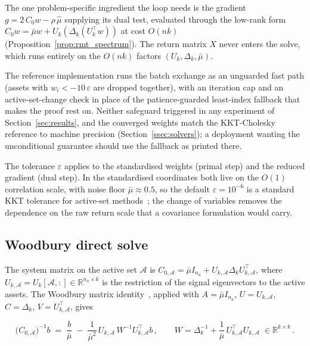 The one problem-specific ingredient the loop needs is the gradient
$g = 2\,C_0 w - \rho\,\hat\mu$ supplying its dual test, evaluated through the
low-rank form $C_0w = \bar\mu w + U_k(\Delta_k(U_k^\top w))$ at cost $O(nk)$
(Proposition~\ref{prop:rmt_spectrum}). The return matrix $X$ never enters the
solve, which runs entirely on the $O(nk)$ factors $(U_k, \Delta_k, \bar\mu)$.

\begin{remark}\label{rem:safeguards}
The reference implementation runs the batch exchange as an unguarded fast path
(assets with $w_i < -10\,\varepsilon$ are dropped together), with an iteration cap
and an active-set-change check in place of the patience-guarded least-index
fallback that~\cite[Algorithm~1]{schmelzer2026nncg} makes the proof rest on.
Neither safeguard triggered in any experiment of Section~\ref{sec:results}, and
the converged weights match the KKT-Cholesky reference to machine precision
(Section~\ref{ssec:solvers}); a deployment wanting the unconditional guarantee
should use the fallback as printed there.
\end{remark}

\begin{remark}\label{rem:tolerance}
The tolerance $\varepsilon$ applies to the standardised weights (primal step) and
the reduced gradient (dual step). In the standardised coordinates both live on the
$O(1)$ correlation scale, with noise floor $\bar\mu \approx 0.5$, so the default
$\varepsilon = 10^{-6}$ is a standard KKT tolerance for active-set
methods~\cite{nocedal2006}; the change of variables removes the dependence on the
raw return scale that a covariance formulation would carry.
\end{remark}

\subsection{Woodbury direct solve}\label{sec:woodbury}

The system matrix on the active set $\mathcal{A}$ is
$C_{0,\mathcal{A}} = \bar\mu I_{n_a} + U_{k,\mathcal{A}}\Delta_k U_{k,\mathcal{A}}^\top$,
where $U_{k,\mathcal{A}} = U_k[\mathcal{A},:] \in \mathbb{R}^{n_a \times k}$ is the restriction
of the signal eigenvectors to the active assets. The Woodbury matrix
identity~\cite{golub2013}, applied with
$A = \bar\mu I_{n_a}$, $U = U_{k,\mathcal{A}}$, $C = \Delta_k$,
$V = U_{k,\mathcal{A}}^\top$, gives

\[
  \bigl(C_{0,\mathcal{A}}\bigr)^{-1}\!b
  \;=\;
  \frac{b}{\bar\mu}
  \;-\;
  \frac{1}{\bar\mu^2}\,
  U_{k,\mathcal{A}}\,
  W^{-1}
  U_{k,\mathcal{A}}^\top b\,,
  \qquad
  W = \Delta_k^{-1} + \frac{1}{\bar\mu}\,U_{k,\mathcal{A}}^\top U_{k,\mathcal{A}}
  \;\in \mathbb{R}^{k \times k}\,.
\]

